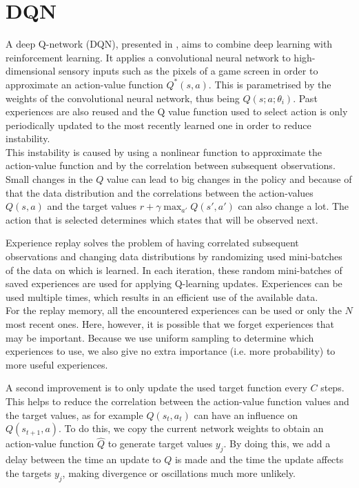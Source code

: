 \documentclass[a4paper]{article}
\begin{document}
\section{DQN}
A deep Q-network (DQN), presented in \cite{Mnih2015Human-levelLearning}, aims to combine deep learning with reinforcement learning. It applies a convolutional neural network to high-dimensional sensory inputs such as the pixels of a game screen in order to approximate an action-value function $Q^{*}(s,a)$. This is parametrised by the weights of the convolutional neural network, thus being $Q(s;a;\theta_i)$. Past experiences are also reused and the Q value function used to select action is only periodically updated to the most recently learned one in order to reduce instability.\\

This instability is caused by using a nonlinear function to approximate the action-value function and by the correlation between subsequent observations. Small changes in the $Q$ value can lead to big changes in the policy and because of that the data distribution and the correlations between the action-values $Q(s,a)$ and the target values $r+\gamma \max_{a'} Q(s',a')$ can also change a lot. The action that is selected determines which states that will be observed next.

Experience replay solves the problem of having correlated subsequent observations and changing data distributions by randomizing used mini-batches of the data on which is learned. In each iteration, these random mini-batches of saved experiences are used for applying Q-learning updates. Experiences can be used multiple times, which results in an efficient use of the available data.\\
For the replay memory, all the encountered experiences can be used or only the $N$ most recent ones. Here, however, it is possible that we forget experiences that may be important. Because we use uniform sampling to determine which experiences to use, we also give no extra importance (i.e. more probability) to more useful experiences.

A second improvement is to only update the used target function every $C$ steps. This helps to reduce the correlation between the action-value function values and the target values, as for example $Q(s_t, a_t)$ can have an influence on $Q(s_{t+1},a)$. To do this, we copy the current network weights to obtain an action-value function $\hat{Q}$ to generate target values $y_j$. By doing this, we add a delay between the time an update to $Q$ is made and the time the update affects the targets $y_j$, making divergence or oscillations much more unlikely.
\end{document}
